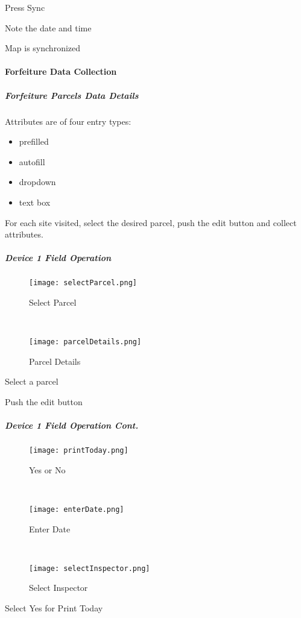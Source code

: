 \noindent Press {\LARGE Sync}
\vspace{2in}

\noindent Note the date and time
\vspace{1.25in}

{\Large Map is synchronized}
\clearpage
\paragraph{Forfeiture Data Collection}
\subparagraph{Forfeiture Parcels Data Details}

Attributes are of four entry types:
\begin{itemize}
\item prefilled
\item autofill
\item dropdown
\item text box
\end{itemize}
For each site visited, select the desired parcel, push the edit button and collect attributes.
\clearpage
\subparagraph[Device 1 Field Operation]{Device 1 Field Operation\texorpdfstring{\\}{}}
\begin{wrapfigure}{r}{0.5\textwidth}
\centering
    \texttt{[image: selectParcel.png]}
\caption {Select Parcel}
\vspace{.25in}

\HRule \\[.4cm] %
\vspace{.25in}

\centering
    \texttt{[image: parcelDetails.png]}
\caption{Parcel Details}
\end{wrapfigure}
Select a parcel
\vspace{4in}

{\normalsize Push the} {\Large edit} {\normalsize button}
\clearpage
\subparagraph*{Device 1 Field Operation Cont.}
\begin{wrapfigure}{r}{0.4\textwidth}
\centering
    \texttt{[image: printToday.png]}
\caption {Yes or No}
\vspace{.05in}

\HRule \\[.4cm] %
\vspace{.05in}

    \texttt{[image: enterDate.png]}
\caption{Enter Date}
\vspace{.05in}

\HRule \\[.4cm] %
\vspace{.05in}

    \texttt{[image: selectInspector.png]}
\caption{Select Inspector}
\end{wrapfigure}
Select Yes for Print Today
\vspace{2.5in}

